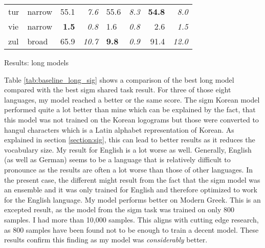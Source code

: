 {\begin{tabularx}{\textwidth}{|l|X||r|r||X|X||r|r|}
tur       & narrow        & 55.1         & \textit{7.6}    & 55.6         & \textit{8.3}          & \textbf{54.8}   & \textit{8.0}    \\
vie       & narrow        & \textbf{1.5} & \textit{0.8}    & 1.6          & \textit{0.8}          & 2.6    & \textit{1.5}    \\
zul       & broad         & 65.9         & \textit{10.7}   & \textbf{9.8}          & \textit{0.9}          & 91.4   & \textit{12.0}   \\ \hline
\end{tabularx}
}{Results: long models}

Table \ref{tab:baseline_long_sig} shows a comparison of the best long model compared with the best \ac{sigm} shared task result. For three of those eight languages, my model reached a better or the same score. The \ac{sigm} Korean model performed quite a lot better than mine which can be explained by the fact, that this model was not trained on the Korean logograms but those were converted to hangul characters which is a Latin alphabet representation of Korean. As explained in section \ref{section:sig}, this can lead to better results as it reduces the vocabulary size. My result for English is a lot worse as well. Generally, English (as well as German) seems to be a language that is relatively difficult to pronounce as the results are often a lot worse than those of other languages. In the present case, the different might result from the fact that the \ac{sigm} model was an ensemble and it was only trained for English and therefore optimized to work for the English language. My model performs better on Modern Greek. This is an excepted result, as the model from the \ac{sigm} task was trained on only 800 samples. I had more than 10,000 samples. This aligns with cutting edge research, as 800 samples have been found not to be enough to train a decent model. These results confirm this finding as my model was \textit{considerably} better.




